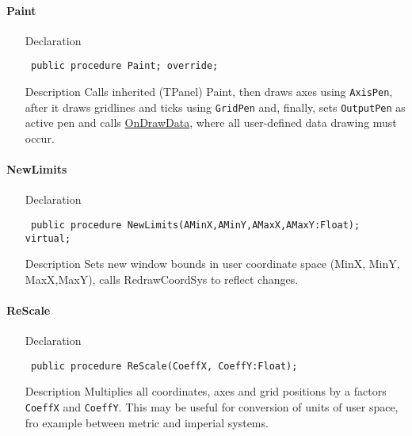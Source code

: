\documentclass[12pt,a4paper,oneside]{report}
\newcommand{\declarationitem}[1]{{\addfontfeatures{FakeSlant} #1}}
\newcommand{\descriptiontitle}[1]{{\addfontfeatures{FakeSlant}#1}}
\newcommand{\code}[1]{\texttt{#1}}
\begin{document}
\paragraph{Paint}\hspace*{\fill}
\label{lmcoordsys.TCoordSys-Paint}
\begin{itemize}\item[\declarationitem{Declaration}\hfill]
\begin{flushleft}
\code{
public procedure Paint; override;}
\end{flushleft}
\item[\descriptiontitle{Description}] Calls inherited (TPanel) Paint, then draws axes using \code{AxisPen}, after it draws gridlines and ticks using \code{GridPen} and, finally, sets \code{OutputPen} as active pen and calls \hyperref[lmcoordsys.TCoordSys-OnDrawData]{OnDrawData}, where all user-defined data drawing must occur.
\end{itemize}
\paragraph{NewLimits}\hspace*{\fill}
\label{lmcoordsys.TCoordSys-NewLimits}
\begin{itemize}\item[\declarationitem{Declaration}\hfill]
	\begin{flushleft}
		\code{
			public procedure NewLimits(AMinX,AMinY,AMaxX,AMaxY:Float); virtual;}
	\end{flushleft}
	\item[\descriptiontitle{Description}]
	Sets new window bounds in user coordinate space (MinX, MinY, MaxX,MaxY), calls RedrawCoordSys to reflect changes.
\end{itemize}
\paragraph{ReScale}\hspace*{\fill}\label{lmcoordsys.TCoordSys-ReScale}
\begin{itemize}\item[\declarationitem{Declaration}\hfill]
	\begin{flushleft}
		\code{
			public procedure ReScale(CoeffX, CoeffY:Float);}
	\end{flushleft}
	\item[\descriptiontitle{Description}]
	Multiplies all coordinates, axes and grid positions by a factors \code{CoeffX} and \code{CoeffY}. This may be useful for conversion of units of user space, fro example between metric and imperial systems.
	
\end{itemize}
\end{document}
